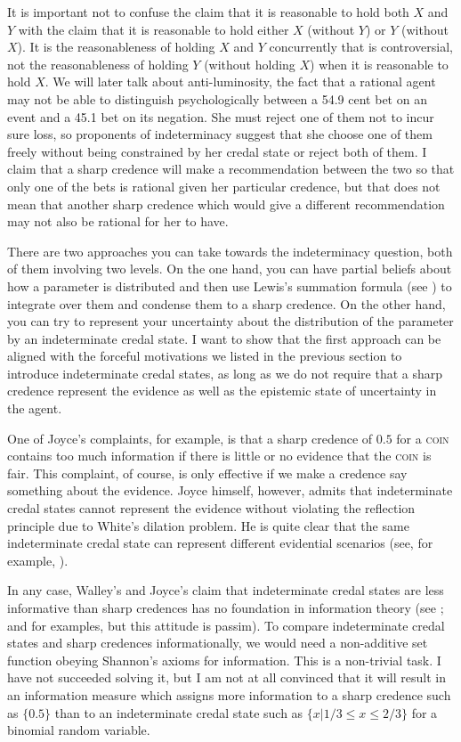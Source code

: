 It is important not to confuse the claim that it is
reasonable to hold both $X$ and $Y$ with the claim that
it is reasonable to hold either $X$ (without $Y$) or
$Y$ (without $X$). It is the reasonableness of holding
$X$ and $Y$ concurrently that is controversial, not the
reasonableness of holding $Y$ (without holding $X$)
when it is reasonable to hold $X$. We will later talk
about anti-luminosity, the fact that a rational agent
may not be able to distinguish psychologically between
a 54.9 cent bet on an event and a 45.1 bet on its
negation. She must reject one of them not to incur sure
loss, so proponents of indeterminacy suggest that she
choose one of them freely without being constrained by
her credal state or reject both of them. I claim that a
sharp credence will make a recommendation between the
two so that only one of the bets is rational given her
particular credence, but that does not mean that
another sharp credence which would give a different
recommendation may not also be rational for her to
have.

There are two approaches you can take towards the
indeterminacy question, both of them involving two
levels. On the one hand, you can have partial beliefs
about how a parameter is distributed and then use
Lewis's summation formula (see
) to integrate over them and
condense them to a sharp credence. On the other hand,
you can try to represent your uncertainty about the
distribution of the parameter by an indeterminate
credal state. I want to show that the first approach
can be aligned with the forceful motivations we listed
in the previous section to introduce indeterminate
credal states, as long as we do not require that a
sharp credence represent the evidence as well as the
epistemic state of uncertainty in the agent.

One of Joyce's complaints, for example, is that a sharp
credence of $0.5$ for a \textsc{coin} contains too much
information if there is little or no evidence that the
\textsc{coin} is fair. This complaint, of course, is
only effective if we make a credence say something
about the evidence. Joyce himself, however, admits that
indeterminate credal states cannot represent the
evidence without violating the reflection principle due
to White's dilation problem. He is quite clear that the
same indeterminate credal state can represent different
evidential scenarios (see, for example,
).

In any case, Walley's and Joyce's claim that
indeterminate credal states are less informative than
sharp credences has no foundation in information theory
(see ; and
 for examples, but this attitude
is passim). To compare indeterminate credal states and
sharp credences informationally, we would need a
non-additive set function obeying Shannon's axioms for
information. This is a non-trivial task. I have not
succeeded solving it, but I am not at all convinced
that it will result in an information measure which
assigns more information to a sharp credence such as
$\{0.5\}$ than to an indeterminate credal state such as
$\{x|1/3\leq{}x\leq{}2/3\}$ for a binomial random
variable.

